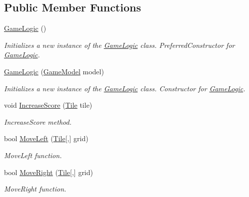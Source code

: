 \subsection*{Public Member Functions}
\begin{DoxyCompactItemize}
\item 
\mbox{\hyperlink{class_game_1_1_game_logic_a0684364f86fc5890d2b722e226c93f1f}{Game\+Logic}} ()
\begin{DoxyCompactList}\small\item\em Initializes a new instance of the \mbox{\hyperlink{class_game_1_1_game_logic}{Game\+Logic}} class. Preferred\+Constructor for \mbox{\hyperlink{class_game_1_1_game_logic}{Game\+Logic}}. \end{DoxyCompactList}\item 
\mbox{\hyperlink{class_game_1_1_game_logic_af24244d8756f86b6ef14fdfb3e60edff}{Game\+Logic}} (\mbox{\hyperlink{class_game_1_1_game_model}{Game\+Model}} model)
\begin{DoxyCompactList}\small\item\em Initializes a new instance of the \mbox{\hyperlink{class_game_1_1_game_logic}{Game\+Logic}} class. Constructor for \mbox{\hyperlink{class_game_1_1_game_logic}{Game\+Logic}}. \end{DoxyCompactList}\item 
void \mbox{\hyperlink{class_game_1_1_game_logic_acfdb89870903c5855e4aeb437e9e9672}{Increase\+Score}} (\mbox{\hyperlink{class_game_1_1_tile}{Tile}} tile)
\begin{DoxyCompactList}\small\item\em Increase\+Score method. \end{DoxyCompactList}\item 
bool \mbox{\hyperlink{class_game_1_1_game_logic_a641318ffaa89d83863f56895f09b50c5}{Move\+Left}} (\mbox{\hyperlink{class_game_1_1_tile}{Tile}}\mbox{[},\mbox{]} grid)
\begin{DoxyCompactList}\small\item\em Move\+Left function. \end{DoxyCompactList}\item 
bool \mbox{\hyperlink{class_game_1_1_game_logic_ad35edbf38f3151d792d4c4cce51c4a2b}{Move\+Right}} (\mbox{\hyperlink{class_game_1_1_tile}{Tile}}\mbox{[},\mbox{]} grid)
\begin{DoxyCompactList}\small\item\em Move\+Right function. \end{DoxyCompactList}\item 

\end{DoxyCompactItemize}
